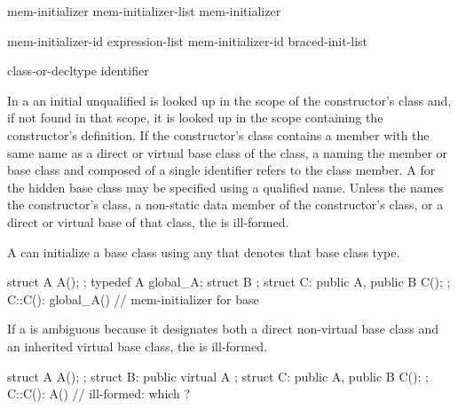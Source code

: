 \begin{bnf}
\br
    mem-initializer \opt\br
    mem-initializer-list \terminal{,} mem-initializer \opt
\end{bnf}

\begin{bnf}
\br
    mem-initializer-id \terminal{(} expression-list\opt{} \terminal{)}\br
    mem-initializer-id braced-init-list
\end{bnf}

\begin{bnf}
\br
    class-or-decltype\br
    identifier
\end{bnf}

\pnum
In a  an initial unqualified
 is looked up in the scope of the constructor's class
and, if not found in that scope, it is looked up in the scope containing the
constructor's definition.
\enternote
If the constructor's class contains a member with the same name as a direct
or virtual base class of the class, a
naming the member or base class and composed of a single identifier
refers to the class member.
A
for the hidden base class may be specified using a qualified name.
\exitnote
Unless the
names the constructor's class,
a non-static data member of the constructor's class, or
a direct or virtual base of that class,
the
is ill-formed.

\pnum
A
can initialize a base class using any  that denotes that base class type.
\enterexample

\begin{codeblock}
struct A { A(); };
  typedef A global_A;
  struct B { };
  struct C: public A, public B { C(); };
  C::C(): global_A() { }        // mem-initializer for base 
\end{codeblock}
\exitexample

\pnum
If a
is ambiguous because it designates both a direct non-virtual base class and
an inherited virtual base class, the
is ill-formed.
\enterexample

\begin{codeblock}
struct A { A(); };
struct B: public virtual A { };
struct C: public A, public B { C(); };
C::C(): A() { }                 // ill-formed: which ?
\end{codeblock}
\exitexample

